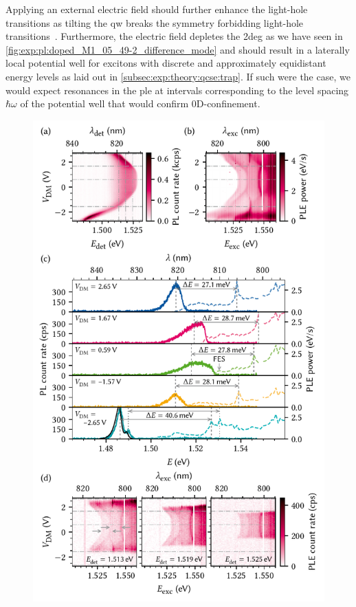 Applying an external electric field should further enhance the light-hole transitions as tilting the \gls{qw} breaks the symmetry forbidding light-hole transitions~\cite{Collins1986,Collins1987}.
Furthermore, the electric field depletes the \gls{2deg} as we have seen in \cref{fig:exp:pl:doped_M1_05_49-2_difference_mode} and should result in a laterally local potential well for excitons with discrete and approximately equidistant energy levels as laid out in \cref{subsec:exp:theory:qcse:trap}.
If such were the case, we would expect resonances in the \gls{ple} at intervals corresponding to the level spacing $\hbar\omega$ of the potential well that would confirm 0D-confinement.

\begin{figure}[H]
    \centering
    \includegraphics{img/pdf/experiment/doped_M1_05_49-2_ple}

\end{figure}
